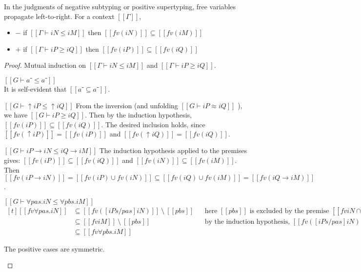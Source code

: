 \begin{lemma} \label{lemma:fv-propagation}
  In the judgments of negative subtyping or positive supertyping,
  free variables propagate left-to-right. For a context $[[Γ]]$,
  \begin{itemize}
    \item $-$ if $[[Γ ⊢ iN ≤ iM]]$ then $[[fv(iN)]] \subseteq [[fv(iM)]]$
    \item $+$ if $[[Γ ⊢ iP ≥ iQ]]$ then $[[fv(iP)]] \subseteq [[fv(iQ)]]$
  \end{itemize}
\end{lemma}
\begin{proof}
  Mutual induction on $[[Γ ⊢ iN ≤ iM]]$ and $[[Γ ⊢ iP ≥ iQ]]$.
  \begin{caseof}
  \item $[[G ⊢ a⁻ ≤ a⁻]]$\\
    It is self-evident that $[[{a⁻} ⊆ {a⁻}]]$.
  \item $[[G ⊢ ↑iP ≤ ↑iQ]]$
    From the inversion (and unfolding $[[G ⊢ iP ≈ iQ]]$ ), we have
    $[[G ⊢ iP ≥ iQ]]$. Then by the induction hypothesis,
    $[[fv(iP)]] \subseteq [[fv(iQ)]]$. The desired 
    inclusion holds, since $[[fv(↑iP)]] = [[fv(iP)]]$ and
    $[[fv(↑iQ)]] = [[fv(iQ)]]$.
  \item $[[G ⊢ iP → iN ≤ iQ → iM]]$
    The induction hypothesis applied to the premises gives:
    $[[fv(iP)]] \subseteq [[fv(iQ)]]$ and
    $[[fv(iN)]] \subseteq [[fv(iM)]]$.
    Then $[[fv(iP → iN)]] = [[fv(iP) ∪ fv(iN)]] \subseteq
    [[fv(iQ) ∪ fv(iM)]] = [[fv(iQ → iM)]]$.

  \item $[[G ⊢ ∀pas.iN ≤ ∀pbs.iM]]$\\
    $
    \begin{aligned}[t]
      [[fv ∀pas.iN ]] &\subseteq [[fv ([iPs/pas] iN) ]] ~\setminus~ [[{pbs}]] 
                      &&   \text{here $[[{pbs}]]$ is excluded by the premise $[[fv iN ∩ {pbs} = ∅]]$}\\
                      &\subseteq [[fv iM]] ~\setminus~ [[{pbs}]]
                      &&   \text{by the induction hypothesis, } [[fv ([iPs/pas] iN) ]] \subseteq [[fv iM]] \\
                      &\subseteq [[fv ∀pbs.iM]]
    \end{aligned}
    $
  \item The positive cases are symmetric.
  \end{caseof}
\end{proof}

